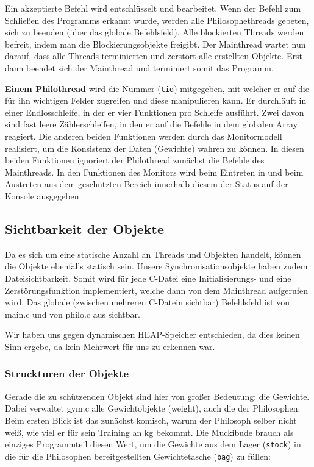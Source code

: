 \documentclass[
   draft=false
  ,paper=a4
  ,twoside=false
  ,fontsize=11pt
  ,headsepline
  ,BCOR10mm
  ,DIV11
  ,parskip=full+
]{scrartcl} %
\begin{document}
Ein akzeptierte Befehl wird entschlüsselt und
bearbeitet. Wenn der Befehl zum Schließen des Programms erkannt wurde, werden
alle Philosophethreads gebeten, sich zu beenden (über das globale
Befehlsfeld). Alle blockierten Threads werden befreit, indem man die
Blockierungsobjekte freigibt. Der Mainthread wartet nun darauf, dass alle
Threads terminierten und zerstört alle erstellten Objekte. Erst dann beendet
sich der Mainthread und terminiert somit das Programm.

\textbf{Einem Philothread} wird die Nummer (\texttt{tid}) mitgegeben, mit
welcher er auf die für ihn wichtigen Felder zugreifen und diese manipulieren kann.
Er durchläuft in einer Endlosschleife, in der er vier Funktionen pro Schleife
ausführt. Zwei davon sind fast leere Zählerschleifen, in den er auf die
Befehle in dem globalen Array reagiert. Die anderen beiden Funktionen werden
durch das Monitormodell realisiert, um die Konsistenz der Daten (Gewichte)
wahren zu können. In diesen beiden Funktionen ignoriert der Philothread zunächst die
Befehle des Mainthreads. In den Funktionen des Monitors wird beim Eintreten in
und beim Austreten aus dem geschützten Bereich innerhalb diesem der Status auf
der Konsole ausgegeben.

\subsection{Sichtbarkeit der Objekte}
  Da es sich um eine statische Anzahl an Threads und Objekten handelt, können
  die Objekte ebenfalls statisch sein. Unsere Synchronisationsobjekte haben
  zudem Dateisichtbarkeit. Somit wird für jede C-Datei eine Initialisierungs-
  und eine Zerstörungsfunktion implementiert, welche dann von dem Mainthread
  aufgerufen wird.
  Das globale (zwischen mehreren C-Datein sichtbar) Befehlsfeld ist von
  main.c und von philo.c aus sichtbar.

  Wir haben uns gegen dynamischen HEAP-Speicher entschieden, da dies keinen
  Sinn ergebe, da kein Mehrwert für uns zu erkennen war.

\subsubsection{Struckturen der Objekte}

Gerade die zu schützenden Objekt sind hier von großer Bedeutung: die Gewichte.
Dabei verwaltet gym.c alle Gewichtobjekte (weight), auch die der Philosophen.
Beim ersten Blick ist das zunächst komisch, warum der Philosoph selber nicht
weiß, wie viel er für sein Training an kg bekommt. Die Muckibude brauch als
einziges Programmteil diesen Wert, um die Gewichte aus dem Lager 
(\texttt{stock}) in die für die Philosophen bereitgestellten Gewichtetasche  
(\texttt{bag}) zu füllen:
\end{document}
